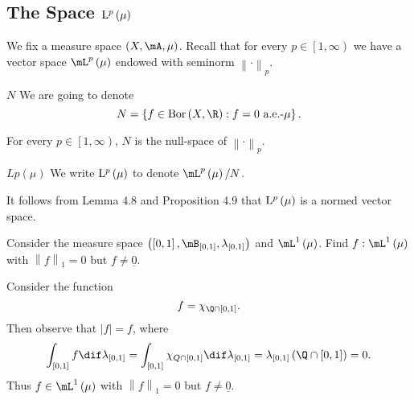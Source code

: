\documentclass[pmath450]{subfiles}
\begin{document}
    \subsection{The Space $\operatorname{L^{\text{$p$}}}\left( \mu \right)$}
    
    We fix a measure space $\left( X,\mA,\mu \right)$. Recall that for every $p\in\left[ 1,\infty \right)$ we have a vector space $\lp\left( \mu \right)$ endowed with seminorm $\left\lVert \cdot\right\rVert_p$.

    \begin{notation}{$N$}
        We are going to denote
        \begin{equation*}
            N = \left\lbrace f\in\bor\left( X,\R \right) : f=0\text{ a.e.-$\mu$} \right\rbrace.
        \end{equation*}
    \end{notation}

    \begin{prop}{}
        For every $p\in\left[ 1,\infty \right)$, $N$ is the null-space of $\left\lVert \cdot\right\rVert_p$.
    \end{prop}

    \rruleline

    \begin{notation}{$Lp\left( \mu \right)$}
        We write $\operatorname{L^{\text{$p$}}}\left( \mu \right)$ to denote $\lp\left( \mu \right) /N$.
    \end{notation}

    \np It follows from Lemma 4.8 and Proposition 4.9 that $\operatorname{L^{\text{$p$}}}\left( \mu \right)$ is a normed vector space.
    
    \begin{exercise}{}
        Consider the measure space $\left( \left[ 0,1 \right],\mB_{\left[ 0,1 \right]},\lambda_{\left[ 0,1 \right]} \right)$ and $\lone\left( \mu \right)$. Find $f:\lone\left( \mu \right)$ with $\left\lVert f \right\rVert_{1}=0$ but $f\neq\underline{0}$.
    \end{exercise}

    \begin{answer}
        Consider the function
        \begin{equation*}
            f = \chi_{\Q\cap\left[ 0,1 \right]}.
        \end{equation*}
        Then observe that $\left| f \right|=f$, where
        \begin{equation*}
            \int_{\left[ 0,1 \right]} f\dif\lambda_{\left[ 0,1 \right]} = \int_{\left[ 0,1 \right]} \chi_{Q\cap\left[ 0,1 \right]} \dif\lambda_{\left[ 0,1 \right]} = \lambda_{\left[ 0,1 \right]}\left( \Q\cap\left[ 0,1 \right] \right) = 0.
        \end{equation*}
        Thus $f\in\lone\left( \mu \right)$ with $\left\lVert f \right\rVert_{1}=0$ but $f\neq\underline{0}$.
    \end{answer}
    
\end{document}
